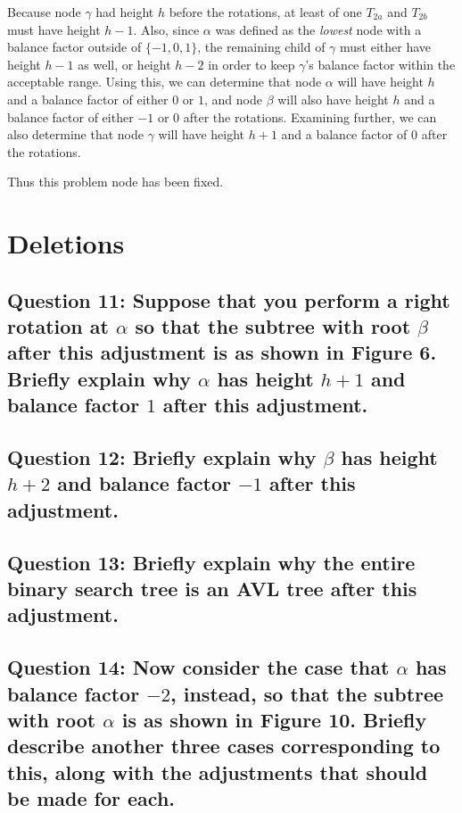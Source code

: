 \documentclass[a4paper, 12pt, titlepage]{article}
\begin{document}
Because node $\gamma$ had height $h$ before the rotations,
at least of one $T_{2a}$ and $T_{2b}$ must have height $h-1$.
Also, since $\alpha$ was defined as the \textit{lowest} node with a balance factor outside of $\{-1,0,1\}$,
the remaining child of $\gamma$ must either have height $h-1$ as well,
or height $h-2$ in order to keep $\gamma$'s balance factor within the acceptable range.
Using this,
we can determine that node $\alpha$ will have height $h$ and a balance factor of either $0$ or $1$,
and node $\beta$ will also have height $h$ and a balance factor of either $-1$ or $0$ after the rotations.
Examining further,
we can also determine that node $\gamma$ will have height $h+1$ and a balance factor of $0$ after the rotations.

Thus this problem node has been fixed.

\section*{Deletions}

\subsection*{Question 11: Suppose that you perform a right rotation at $\alpha$ so that the subtree with root $\beta$ after this adjustment is as shown in Figure 6. Briefly explain why $\alpha$ has height $h+1$ and balance factor $1$ after this adjustment.} 



\subsection*{Question 12: Briefly explain why $\beta$ has height $h+2$ and balance factor $-1$ after this adjustment.} 

\subsection*{Question 13: Briefly explain why the entire binary search tree is an AVL tree after this adjustment.} 

\subsection*{Question 14: Now consider the case that $\alpha$ has balance factor $-2$, instead, so that the subtree with root $\alpha$ is as shown in Figure 10. Briefly describe another three cases corresponding to this, along with the adjustments that should be made for each.} 
\end{document}
